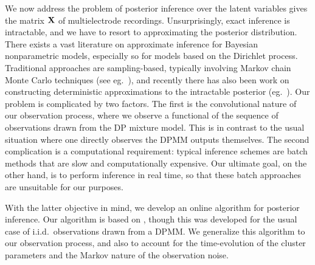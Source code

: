 \newcommand{\tx}{\tilde{x}}

We now address the problem of posterior inference over the latent variables gives the matrix $\mathbf{X}$ of multielectrode recordings. Unsurprisingly, exact 
inference is intractable, and we have to resort to approximating the posterior distribution.
There exists a vast literature on approximate inference for Bayesian nonparametric models, especially so for models based on the Dirichlet process.
Traditional approaches are sampling-based, typically involving Markov chain Monte Carlo techniques (see eg.\ \citep{Nea2000, IshJam2001}), 
and recently there has also been work on constructing deterministic approximations to the intractable posterior (eg.\ \citep{BleJor2006, MinGha2003}).
Our problem is complicated by two factors. The first is the convolutional nature of our observation process, where we observe a functional of the 
sequence of observations drawn from the DP mixture model. This is in contrast to the usual situation where one directly observes the DPMM outputs themselves.
The second complication is a computational requirement: typical inference schemes are batch methods that are slow and computationally expensive. 
Our ultimate goal, on the other hand, is to perform inference in real time, so that these batch approaches are unsuitable for our purposes.

With the latter objective in mind, we develop an online algorithm for posterior inference. Our algorithm is based on \cite{WangDun2009}, though this was 
developed for the usual case of i.i.d.\ observations drawn from a DPMM. We generalize this algorithm to our observation process, and also 
to account for the time-evolution of the cluster parameters and the Markov nature of the observation noise.

